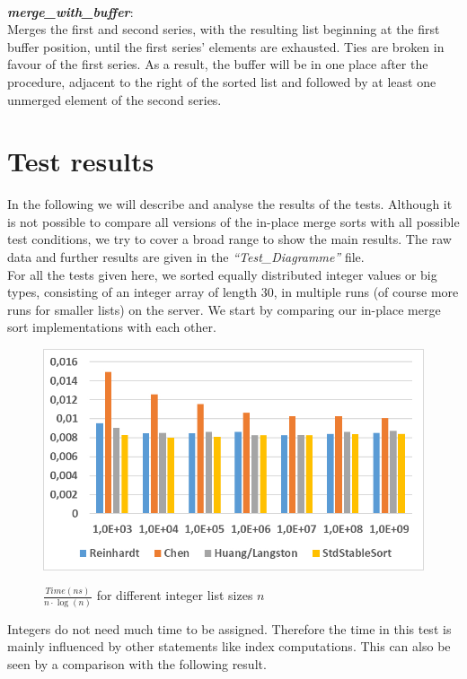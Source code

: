 \documentclass[11pt,pdftex,a4paper, twocolumn]{article}
\begin{document}
$ $ \\
\textbf{\textit{merge\_with\_buffer}}: \\
Merges the first and second series, with the resulting list beginning at the first buffer position, until the first series’ elements are exhausted. Ties are broken in favour of the first series. As a result, the buffer will be in one place after the procedure, adjacent to the right of the sorted list and followed by at least one unmerged element of the second series.

\section*{Test results}
In the following we will describe and analyse the results of the tests. Although it is not possible to compare all versions of the in-place merge sorts with all possible test conditions, we try to cover a broad range to show the main results. The raw data and further results are given in the \textit{“Test\_Diagramme”} file. \\
For all the tests given here, we sorted equally distributed integer values or big types, consisting of an integer array of length 30, in multiple runs (of course more runs for smaller lists) on the server. \newpage We start by comparing our in-place merge sort implementations with each other. \\
\begin{figure}[H]
\includegraphics[width=\linewidth]{Diagramm-Bilder/ints-time.JPG} \\
\caption{ $ \frac{Time(ns)}{n \cdot \log(n)} $ for different integer list sizes $ n $ } \label{fig:ints-time}
\end{figure}
Integers do not need much time to be assigned. Therefore the time in this test is mainly influenced by other statements like index computations. This can also be seen by a comparison with the following result. \\
\end{document}
